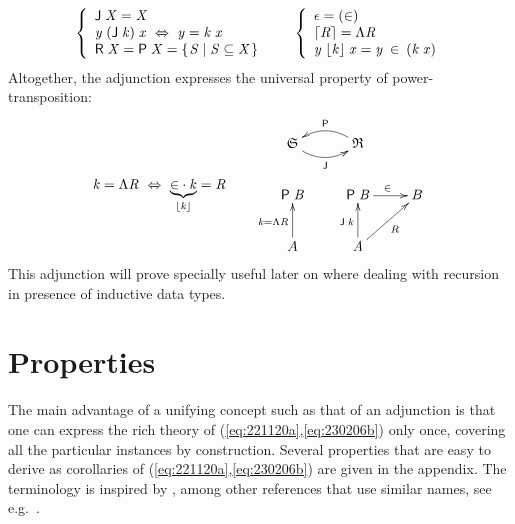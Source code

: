 \documentclass{elsarticle}
\newcommand{\Conid}[1]{\mathit{#1}}
\newcommand{\Varid}[1]{\mathit{#1}}
\def\myxym#1{\vcenter{\xymatrix{#1}}}
\def\xarrayin#1{\begin{array}{ccccccc}#1\end{array}}
\newenvironment{lcbr}{\left\{\begin{array}{l}}{\end{array}\right.}
\def\comp{ \mathbin{\cdot} }
\def\fun#1{\mathsf{#1}}
\def\wider#1{~ #1 ~}
\def\cat#1{{\mathfrak #1}}
\def\equiv{\Leftrightarrow}
\begin{document}
\begin{eqnarray}
\xarrayin{
	\ensuremath{\begin{lcbr}\fun J \;\Conid{X}\mathrel{=}\Conid{X}\\\Varid{y}\;(\fun J \;\Varid{k})\;\Varid{x}~\Leftrightarrow~\Varid{y}\mathrel{=}\Varid{k}\;\Varid{x}\\\fun R \;\Conid{X}\mathrel{=}\fun P \;\Conid{X}\mathrel{=}\{\mskip1.5mu \Conid{S}\mid \Conid{S} \subseteq \Conid{X}\mskip1.5mu\}\end{lcbr}}
&&
	\ensuremath{\begin{lcbr}\epsilon \mathrel{=}(\mathbin\in )\\\lceil \Conid{R}\rceil\mathrel{=}\Lambda{\Conid{R}}\\\Varid{y}\;\lfloor \Varid{k}\rfloor\;\Varid{x}\mathrel{=}\Varid{y}\;\mathbin\in \;(\Varid{k}\;\Varid{x})\end{lcbr}}
}
	\label{eq:230209a}
\end{eqnarray}
Altogether, the adjunction expresses the universal property of power-transposition:
\begin{eqnarray}
	\ensuremath{\Varid{k}\mathrel{=}\Lambda{\Conid{R}}}
	\wider\equiv
	\ensuremath{\underbrace{\mathbin\in  \comp \Varid{k}}_{\lfloor \Varid{k}\rfloor}\mathrel{=}\Conid{R}}
& \rule{1em}{0pt}&
        \myxym{
	\ensuremath{\cat{S}}
		\ar@/_0.8pc/[r]_-{\ensuremath{\fun J }}
&
	\ensuremath{\cat{R}}
		\ar@/_0.8pc/[l]_-{\ensuremath{\fun P }}
\\
	\ensuremath{\fun P \;\Conid{B}}
&
	\ensuremath{\fun P \;\Conid{B}}
		\ar[r]^{\ensuremath{\mathbin\in }}
&
	B
\\
	A
		\ar[u]^{\ensuremath{\Varid{k}\mathrel{=}\Lambda{\Conid{R}}}}
&
	\ensuremath{\Conid{A}}
	\ar[u]^{\ensuremath{\fun J \;\Varid{k}}}
	\ar[ru]_{R}
}
	\label{eq:230301c}
\end{eqnarray}
This adjunction will prove specially useful later on where dealing with recursion 
in presence of inductive data types.

\section{Properties}
The main advantage of a unifying concept such as that of an adjunction is that one
can express the rich theory of (\ref{eq:221120a},\ref{eq:230206b}) only once, covering
all the particular instances by construction. Several properties that are easy to derive
as corollaries of (\ref{eq:221120a},\ref{eq:230206b}) are given in the appendix.
The terminology is inspired by \cite{BM97}, among other references that
use similar names, see e.g.\ \cite{Ol05}.
\end{document}
